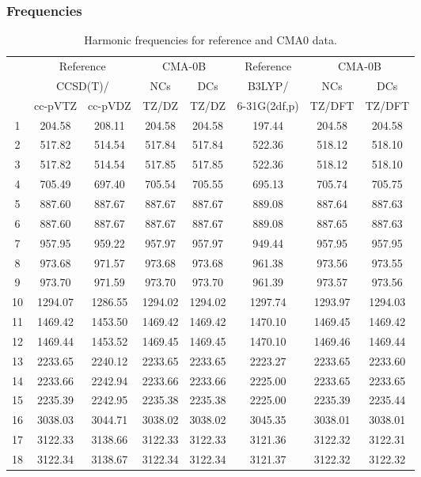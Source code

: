 \documentclass[10pt,oneside]{article}
\begin{document}
\subsubsection*{Frequencies}
\begin{table}[h!]
\centering
\caption{Harmonic frequencies for reference and CMA0 data.}
\begin{tabular}{cccccccc}
\toprule
{} & \multicolumn{2}{c}{Reference} & \multicolumn{2}{c}{CMA-0B} &    Reference & \multicolumn{2}{c}{CMA-0B} \\
{} & \multicolumn{2}{c}{CCSD(T)/} &     NCs &     DCs &       B3LYP/ &     NCs &     DCs \\
{} &   cc-pVTZ & cc-pVDZ &   TZ/DZ &   TZ/DZ & 6-31G(2df,p) &  TZ/DFT &  TZ/DFT \\
\midrule
1  &    204.58 &  208.11 &  204.58 &  204.58 &       197.44 &  204.58 &  204.58 \\
2  &    517.82 &  514.54 &  517.84 &  517.84 &       522.36 &  518.12 &  518.10 \\
3  &    517.82 &  514.54 &  517.85 &  517.85 &       522.36 &  518.12 &  518.10 \\
4  &    705.49 &  697.40 &  705.54 &  705.55 &       695.13 &  705.74 &  705.75 \\
5  &    887.60 &  887.67 &  887.67 &  887.67 &       889.08 &  887.64 &  887.63 \\
6  &    887.60 &  887.67 &  887.67 &  887.67 &       889.08 &  887.65 &  887.63 \\
7  &    957.95 &  959.22 &  957.97 &  957.97 &       949.44 &  957.95 &  957.95 \\
8  &    973.68 &  971.57 &  973.68 &  973.68 &       961.38 &  973.56 &  973.55 \\
9  &    973.70 &  971.59 &  973.70 &  973.70 &       961.39 &  973.57 &  973.56 \\
10 &   1294.07 & 1286.55 & 1294.02 & 1294.02 &      1297.74 & 1293.97 & 1294.03 \\
11 &   1469.42 & 1453.50 & 1469.42 & 1469.42 &      1470.10 & 1469.45 & 1469.42 \\
12 &   1469.44 & 1453.52 & 1469.45 & 1469.45 &      1470.10 & 1469.46 & 1469.44 \\
13 &   2233.65 & 2240.12 & 2233.65 & 2233.65 &      2223.27 & 2233.65 & 2233.60 \\
14 &   2233.66 & 2242.94 & 2233.66 & 2233.66 &      2225.00 & 2233.65 & 2233.65 \\
15 &   2235.39 & 2242.95 & 2235.38 & 2235.38 &      2225.00 & 2235.39 & 2235.44 \\
16 &   3038.03 & 3044.71 & 3038.02 & 3038.02 &      3045.35 & 3038.01 & 3038.01 \\
17 &   3122.33 & 3138.66 & 3122.33 & 3122.33 &      3121.36 & 3122.32 & 3122.31 \\
18 &   3122.34 & 3138.67 & 3122.34 & 3122.34 &      3121.37 & 3122.32 & 3122.32 \\
\bottomrule
\end{tabular}
\end{table}
\end{document}
